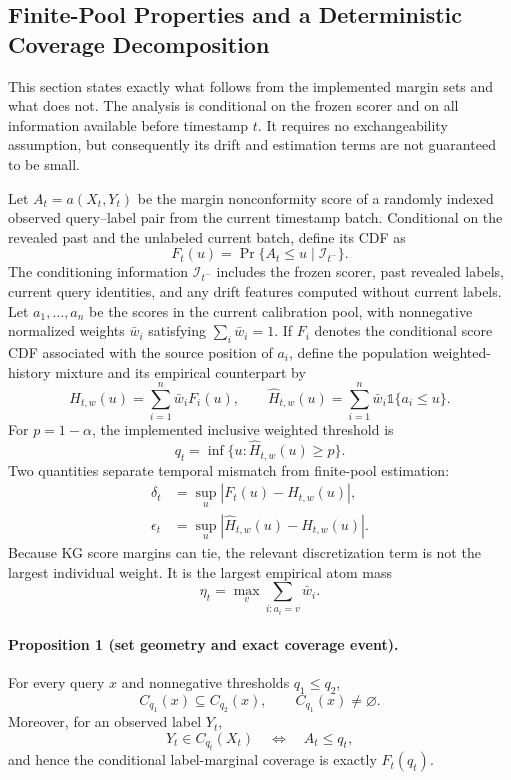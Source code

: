 \subsection{Finite-Pool Properties and a Deterministic Coverage Decomposition}
\label{sec:theory-scope}

This section states exactly what follows from the implemented margin sets and
what does not.  The analysis is conditional on the frozen scorer and on all
information available before timestamp \(t\).  It requires no exchangeability
assumption, but consequently its drift and estimation terms are not guaranteed
to be small.

Let \(A_t=a(X_t,Y_t)\) be the margin nonconformity score of a randomly indexed
observed query--label pair from the current timestamp batch.  Conditional on
the revealed past and the unlabeled current batch, define its CDF as
\[
  F_t(u)=\Pr\{A_t\leq u\mid\mathcal{I}_{t^-}\}.
\]
The conditioning information \(\mathcal{I}_{t^-}\) includes the frozen scorer,
past revealed labels, current query identities, and any drift features computed
without current labels.  Let \(a_1,\ldots,a_n\) be the scores in the current
calibration pool, with nonnegative normalized weights
\(\bar w_i\) satisfying \(\sum_i\bar w_i=1\).  If \(F_i\) denotes the
conditional score CDF associated with the source position of \(a_i\), define
the population weighted-history mixture and its empirical counterpart by
\[
  H_{t,w}(u)=\sum_{i=1}^{n}\bar w_iF_i(u),
  \qquad
  \widehat H_{t,w}(u)=\sum_{i=1}^{n}\bar w_i
  \mathbb{1}\{a_i\leq u\}.
\]
For \(p=1-\alpha\), the implemented inclusive weighted threshold is
\[
  q_t=\inf\{u:\widehat H_{t,w}(u)\geq p\}.
\]
Two quantities separate temporal mismatch from finite-pool estimation:
\[
\begin{aligned}
  \delta_t&=\sup_u|F_t(u)-H_{t,w}(u)|,\\
  \epsilon_t&=\sup_u|\widehat H_{t,w}(u)-H_{t,w}(u)|.
\end{aligned}
\]
Because KG score margins can tie, the relevant discretization term is not the
largest individual weight.  It is the largest empirical atom mass
\[
  \eta_t=\max_v\sum_{i:a_i=v}\bar w_i.
\]

\paragraph{Proposition 1 (set geometry and exact coverage event).}
For every query \(x\) and nonnegative thresholds \(q_1\leq q_2\),
\[
  C_{q_1}(x)\subseteq C_{q_2}(x),
  \qquad C_{q_1}(x)\neq\varnothing.
\]
Moreover, for an observed label \(Y_t\),
\[
  Y_t\in C_{q_t}(X_t)
  \quad\Longleftrightarrow\quad A_t\leq q_t,
\]
and hence the conditional label-marginal coverage is exactly \(F_t(q_t)\).

